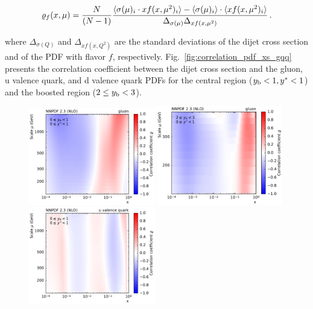 \begin{equation}
  \varrho_f (x,\mu) =
  \frac{N}{(N-1)} \frac{%
    \langle \sigma(\mu)_i \cdot xf(x,\mu^2)_i \rangle -
    \langle \sigma(\mu)_i \rangle \cdot
    \langle xf(x,\mu^2)_i \rangle}
  {\Delta_{\sigma(\mu)} \Delta_{xf(x,\mu^2)}}\,.
\end{equation}

where $\Delta_{\sigma(Q)}$ and $\Delta_{xf(x,Q^2)}$ are the standard deviations of the
dijet cross section and of the PDF with flavor $f$, respectively.
Fig.~\ref{fig:correlation_pdf_xs_gqq} presents the correlation coefficient
between the dijet cross section and the gluon, u valence quark, and d valence
quark PDFs for the central region ($y_{\mathrm{b}} < 1, y^{*} < 1$) and the
boosted region ($2 \leq y_{\mathrm{b}} < 3$).

\begin{figure}[p]
  \centering
  \includegraphics[width=0.49\textwidth]{figures/pdf_constraints/corr_PTMAXEXPYS_YBYS_NLO_FINALBINS_NNPDF23_gluon_ys0_0yb0_0_cl.pdf}\hfill%
  \includegraphics[width=0.49\textwidth]{figures/pdf_constraints/corr_PTMAXEXPYS_YBYS_NLO_FINALBINS_NNPDF23_gluon_ys0_0yb2_0_cl.pdf}
  \includegraphics[width=0.49\textwidth]{figures/pdf_constraints/corr_PTMAXEXPYS_YBYS_NLO_FINALBINS_NNPDF23_u_valence_quark_ys0_0yb0_0_cl.pdf}\hfill%

\end{figure}

